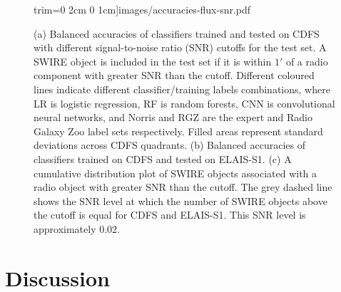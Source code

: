 \documentclass[fleqn,usenatbib,usedcolumn]{mnras}
\begin{document}
\begin{figure}
                     trim={0 2cm 0 1cm}]{images/accuracies-flux-snr.pdf}
    \caption{(a) Balanced accuracies of classifiers trained and tested on CDFS
      with different signal-to-noise ratio (SNR) cutoffs for the test set. A
      SWIRE object is included in the test set if it is within $1'$ of a radio
      component with greater SNR than the cutoff. Different coloured lines
      indicate different classifier/training labels combinations, where LR is
      logistic regression, RF is random forests, CNN is convolutional neural
      networks, and Norris and RGZ are the expert and Radio Galaxy Zoo label
      sets respectively. Filled areas represent standard deviations across
      CDFS quadrants. (b) Balanced accuracies of classifiers trained on CDFS
      and tested on ELAIS-S1. (c) A cumulative distribution plot of SWIRE
      objects associated with a radio object with greater SNR than the cutoff.
      The grey dashed line shows the SNR level at which the number of SWIRE
      objects above the cutoff is equal for CDFS and ELAIS-S1. This SNR level
      is approximately $0.02$.}
    \label{fig:accuracies-flux}
  \end{figure}


\section{Discussion}
\end{document}
